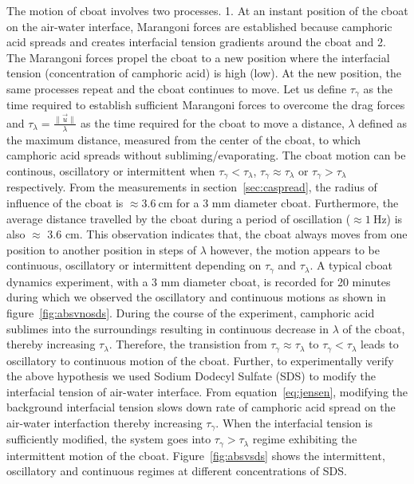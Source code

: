 \documentclass[aps,twocolumn, floatfix, superscriptaddress]{revtex4}
\begin{document}
The motion of cboat involves two processes. 1. At an instant position of the cboat on the air-water interface, Marangoni forces are established because camphoric acid spreads and creates interfacial tension gradients around the cboat and 2. The Marangoni forces propel the cboat to a new position where the interfacial tension (concentration of camphoric acid) is high (low). At the new position, the same processes repeat and the cboat continues to move. Let us define $\tau_{\gamma}$ as the time required to establish sufficient Marangoni forces to overcome the drag forces and $\tau_{\lambda} = \frac{\|\vec{u}\|}{\lambda}$ as the time required for the cboat to move a distance, $\lambda$ defined as the maximum distance, measured from the center of the cboat, to which camphoric acid spreads without subliming/evaporating. The cboat motion can be continous, oscillatory or intermittent when $\tau_{\gamma} < \tau_{\lambda}$, $\tau_{\gamma} \approx \tau_{\lambda}$ or $\tau_{\gamma} > \tau_{\lambda}$ respectively. From the measurements in section~\ref{sec:caspread}, the radius of influence of the cboat is $\approx 3.6\ \mathrm{cm}$ for a 3 $\mathrm{mm}$ diameter cboat. Furthermore, the average distance travelled by the cboat during a period of oscillation ($\approx 1\ \mathrm{Hz}$) is also $\approx$ 3.6 $\mathrm{cm}$. This observation indicates that, the cboat always moves from one position to another position in steps of $\lambda$ however, the motion appears to be continuous, oscillatory or intermittent depending on $\tau_{\gamma}$ and $\tau_{\lambda}$. A typical cboat dynamics experiment, with a 3 $\mathrm{mm}$ diameter cboat, is recorded for 20 minutes during which we observed the oscillatory and continuous motions as shown in figure~\ref{fig:absvnosds}. During the course of the experiment, camphoric acid sublimes into the surroundings resulting in continuous decrease in $\lambda$ of the cboat, thereby increasing $\tau_{\lambda}$. Therefore, the transistion from $\tau_{\gamma} \approx \tau_{\lambda}$ to $\tau_{\gamma} < \tau_{\lambda}$ leads to oscillatory to continuous motion of the cboat. Further, to experimentally verify the above hypothesis we used Sodium Dodecyl Sulfate (SDS) to modify the interfacial tension of air-water interface. From equation~\ref{eq:jensen}, modifying the background interfacial tension slows down rate of camphoric acid spread on the air-water interfaction thereby increasing $\tau_{\gamma}$. When the interfacial tension is sufficiently modified, the system goes into $\tau_{\gamma} > \tau_{\lambda}$ regime exhibiting the intermittent motion of the cboat. Figure~\ref{fig:absvsds} shows the intermittent, oscillatory and continuous regimes at different concentrations of SDS.
\end{document}
